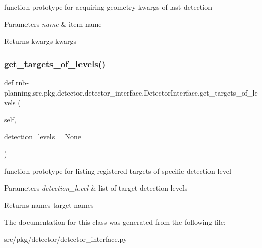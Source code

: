 function prototype for acquiring geometry kwargs of last detection 


\begin{DoxyParams}{Parameters}
{\em name} & item name \\
\hline
\end{DoxyParams}
\begin{DoxyReturn}{Returns}
kwargs kwargs 
\end{DoxyReturn}
\mbox{\label{classrnb-planning_1_1src_1_1pkg_1_1detector_1_1detector__interface_1_1_detector_interface_aca91ec41e0e87dcca165c6eb10806357}} 
\subsubsection{\texorpdfstring{get\+\_\+targets\+\_\+of\+\_\+levels()}{get\_targets\_of\_levels()}}
{\footnotesize\ttfamily def rnb-\/planning.\+src.\+pkg.\+detector.\+detector\+\_\+interface.\+Detector\+Interface.\+get\+\_\+targets\+\_\+of\+\_\+levels (\begin{DoxyParamCaption}\item[{}]{self,  }\item[{}]{detection\+\_\+levels = {\ttfamily None} }\end{DoxyParamCaption})}



function prototype for listing registered targets of specific detection level 


\begin{DoxyParams}{Parameters}
{\em detection\+\_\+level} & list of target detection levels \\
\hline
\end{DoxyParams}
\begin{DoxyReturn}{Returns}
names target names 
\end{DoxyReturn}


The documentation for this class was generated from the following file\+:\begin{DoxyCompactItemize}
\item 
src/pkg/detector/detector\+\_\+interface.\+py\end{DoxyCompactItemize}

